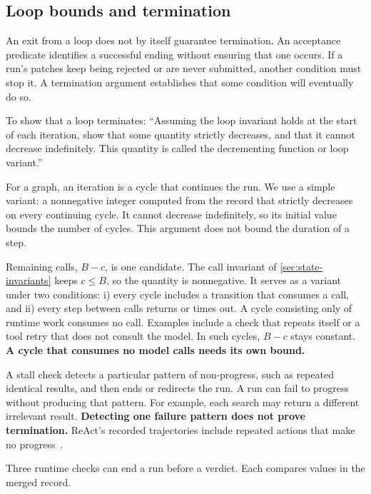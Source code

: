\subsection{Loop bounds and termination}
\label{sec:control-bounds}

An exit from a loop does not by itself guarantee termination. An acceptance
predicate identifies a successful ending without ensuring that one occurs. If a run's patches
keep being rejected or are never submitted, another condition must stop it. A termination argument
establishes that some condition will eventually do so.

\begin{definition}[Variant]
\label{def:variant}
To show that a loop terminates: ``Assuming the loop invariant holds at the start of each iteration,
show that some quantity strictly decreases, and that it cannot decrease indefinitely. This quantity
is called the decrementing function or loop variant.''~\citep{cornell-cs2112-loopinv}
\end{definition}

For a graph, an iteration is a cycle that continues the run. We use a simple variant: a nonnegative
integer computed from the record that strictly decreases on every continuing cycle. It cannot
decrease indefinitely, so its initial value bounds the number of cycles. This argument does not
bound the duration of a step.

Remaining calls, $B - c$, is one candidate. The call invariant of \cref{sec:state-invariants} keeps
$c \leq B$, so the quantity is nonnegative. It serves as a variant under two conditions: i) every
cycle includes a transition that consumes a call, and ii) every step between calls returns or
times out. A cycle consisting only of runtime work consumes no call. Examples include a check
that repeats itself or a tool retry that does not consult the model. In such cycles, $B - c$ stays
constant. \textbf{A cycle that consumes no model calls needs its own bound.}

A stall check detects a particular pattern of non-progress, such as repeated identical results,
and then ends or redirects the run. A run can fail to progress without producing that pattern.
For example, each search may return a different irrelevant result. \textbf{Detecting one failure
pattern does not prove termination.} ReAct's recorded trajectories include repeated actions that
make no progress~\citep[\S3.3]{yao2023react}.

Three runtime checks can end a run before a verdict. Each compares values in the merged record.

